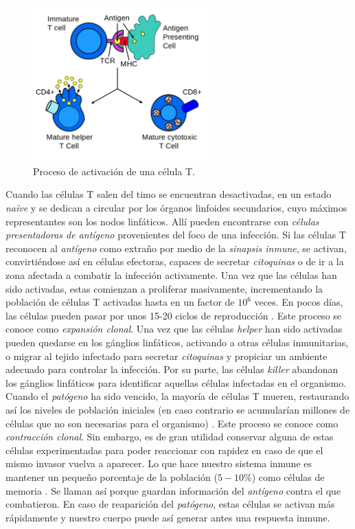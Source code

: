 \begin{figure}[t]
	\centering
	\includegraphics[width=0.6\textwidth]{Imagenes/EstadoDeLaCuestion/Antigen_presentation}
	\caption{Proceso de activación de una célula T.}
	\label{fig:antigen_presentation}
\end{figure}


Cuando las células T salen del timo se encuentran desactivadas, en un estado \textit{naïve} y se dedican a circular por los órganos linfoides secundarios, cuyo máximos representantes son los nodos linfáticos. Allí pueden encontrarse con \textit{células presentadoras de antígeno} provenientes del foco de una infección. Si las células T reconocen al \textit{antígeno} como extraño por medio de la \textit{sinapsis inmune}, se activan, convirtiéndose así en células efectoras, capaces de secretar \textit{citoquinas} o de ir a la zona afectada a combatir la infección activamente. Una vez que las células han sido activadas, estas comienzan a proliferar masivamente, incrementando la población de células T activadas hasta en un factor de $10^6$ veces. En pocos días, las células pueden pasar por unos 15-20 ciclos de reproducción \citep{JTB}. Este proceso se conoce como \textit{expansión clonal}. Una vez que las células \textit{helper} han sido activadas pueden quedarse en los gánglios linfáticos, activando a otras células inmunitarias, o migrar al tejido infectado para secretar \textit{citoquinas} y propiciar un ambiente adecuado para controlar la infección. Por su parte, las células \textit{killer} abandonan los gánglios linfáticos para identificar aquellas células infectadas en el organismo. Cuando el \textit{patógeno} ha sido vencido, la mayoría de células T mueren, restaurando así los niveles de población iniciales (en caso contrario se acumularían millones de células que no son necesarias para el organismo) \citep{fernandez2012mecanica}. Este proceso se conoce como \textit{contracción clonal}. Sin embargo, es de gran utilidad conservar alguna de estas células experimentadas para poder reaccionar con rapidez en caso de que el mismo invasor vuelva a aparecer. Lo que hace nuestro sistema inmune es mantener un pequeño porcentaje de la población  ($5-10\%$) como células de memoria \citep{JTB}. Se llaman así porque guardan información del \textit{antígeno} contra el que combatieron. En caso de reaparición del \textit{patógeno}, estas células se activan más rápidamente y nuestro cuerpo puede así generar antes una respuesta inmune.


